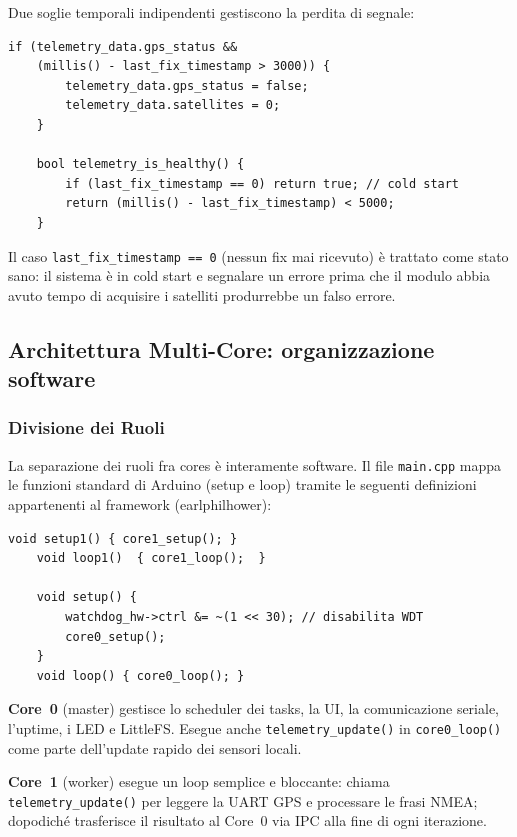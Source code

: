 Due soglie temporali indipendenti gestiscono la perdita di segnale:

\begin{lstlisting}[caption={telemetry.cpp --- timeout fix e health check}]
	if (telemetry_data.gps_status &&
	(millis() - last_fix_timestamp > 3000)) {
		telemetry_data.gps_status = false;
		telemetry_data.satellites = 0;
	}

	bool telemetry_is_healthy() {
		if (last_fix_timestamp == 0) return true; // cold start
		return (millis() - last_fix_timestamp) < 5000;
	}
\end{lstlisting}

Il caso \texttt{last\_fix\_timestamp == 0} (nessun fix mai ricevuto) è trattato
come stato sano: il sistema è in cold start e segnalare un errore prima che il
modulo abbia avuto tempo di acquisire i satelliti produrrebbe un falso errore.


\subsection{Architettura Multi-Core: organizzazione software}


\subsubsection*{Divisione dei Ruoli}

La separazione dei ruoli fra cores è interamente software. Il file \texttt{main.cpp} mappa le funzioni standard di Arduino (setup e  loop) tramite le seguenti definizioni appartenenti al framework (earlphilhower):

\begin{lstlisting}[caption={main.cpp --- mapping dual-core}]
	void setup1() { core1_setup(); }
	void loop1()  { core1_loop();  }
	
	void setup() {
		watchdog_hw->ctrl &= ~(1 << 30); // disabilita WDT
		core0_setup();
	}
	void loop() { core0_loop(); }
\end{lstlisting}


\textbf{Core~0} (master) gestisce lo scheduler dei tasks, la UI, la
comunicazione seriale, l'uptime, i LED e LittleFS. Esegue anche
\texttt{telemetry\_update()} in \texttt{core0\_loop()} come parte dell'update rapido dei sensori locali.


\textbf{Core~1} (worker) esegue un loop semplice e bloccante: chiama \texttt{telemetry\_update()} per leggere la UART GPS e processare le frasi NMEA; dopodiché trasferisce il risultato al Core~0 via IPC alla fine di ogni iterazione.




